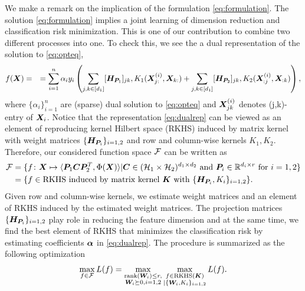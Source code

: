 \documentclass[12pt]{article}
\begin{document}
We make a remark on the implication of the formulation \eqref{eq:formulation}.
The solution \eqref{eq:formulation} implies a joint learning of dimension reduction and classification risk minimization. This is one of our contribution to combine two different processes into one. To check this, we see the a dual representation of the solution to \eqref{eq:opteq},
\begin{align}\label{eq:dualrep}
f(\bm X) &= 
&= \sum_{i=1}^n\alpha_iy_i\left(\sum_{j,k\in[d_1]} [\bm{H}_{\bm{P}_1}]_{jk},K_1(\bm X^{(i)}_{j:},\bm X_{k:})+\sum_{j,k\in[d_1]} [\bm{H}_{\bm{P}_2}]_{jk},K_2(\bm X^{(i)}_{:j},\bm X_{:k})\right),
\end{align}
where $\{\alpha_i\}_{i=1}^n$ are  (sparse) dual solution to \eqref{eq:opteq} and $\bm X^{(i)}_{jk}$ denotes (j,k)-entry of $\bm X_i$. Notice that the representation  \eqref{eq:dualrep} can be viewed as an element of reproducing kernel Hilbert space (RKHS) induced by matrix kernel with weight matrices $\{\bm{H}_{\bm{P}_i}\}_{i=1,2}$ and row and column-wise kernels $K_1,K_2$.
Therefore, our considered function space $\mathcal{F}$ can be written as  
\begin{align}
    \mathcal{F} &= \{f\colon\bm X\mapsto\langle\bm{P}_1\bm C\bm{P}_2^T,\Phi(\bm X)\rangle|\bm C\in(\mathcal{H}_1\times \mathcal{H}_2)^{d_1\times d_2} \text{ and }\bm{P}_i \in\mathbb{R}^{d_i\times r} \text{ for } i=1,2\}\\
    &=\{f\in \text{RKHS induced by matrix kernel } \bm K \text{ with } \{\bm{H}_{\bm{P}_i},K_i\}_{i=1,2}\}.
\end{align}
Given row and column-wise kernels, we estimate weight matrices and an element of RKHS induced by the estimated weight matrices.
The projection matrices $\{\bm{H}_{\bm{P}_i}\}_{i=1,2}$ play role in reducing  the feature dimension and at the same time, we find the best element of RKHS that minimizes the classification risk by estimating coefficients $\bm\alpha$ in \eqref{eq:dualrep}. The procedure is summarized as the following optimization
\begin{align}
    \max_{f\in\mathcal{F}}L(f)  = \max_{\substack{\text{rank}(\bm{W}_i)\leq r,\\ \bm{W}_i\succeq 0,i = 1,2}}\max_{\substack{f\in\text{RKHS} (\bm K)\\ |\{\bm{W}_i,K_i\}_{i=1,2}}}L(f).
\end{align}
\end{document}
